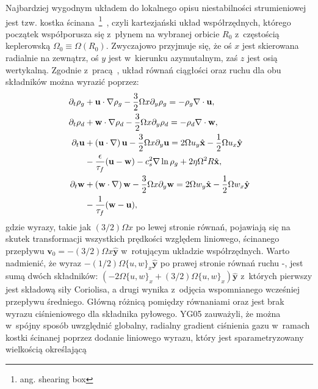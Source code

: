 Najbardziej wygodnym układem do lokalnego opisu niestabilności strumieniowej
jest tzw. kostka ścinana~\footnote{ang. shearing box}~\citep{HGB95}, czyli
kartezjański układ współrzędnych, którego początek współporusza się z~płynem na
wybranej orbicie $R_0$ z~częstością keplerowską $\Omega_0 \equiv
\Omega\left(R_0\right)$. Zwyczajowo przyjmuje się, że oś $x$ jest skierowana
radialnie na zewnątrz, oś $y$ jest w~kierunku azymutalnym, zaś $z$ jest osią
wertykalną. Zgodnie z~pracą~\cite*{YJ07}, układ równań ciągłości oraz ruchu dla
obu składników można wyrazić poprzez:
%
\begin{align}
\partial_t \rho_g &+ \mathbf{u}\cdot\nabla\rho_g - \frac{3}{2}\Omega x\partial_y\rho_g 
 = -\rho_g\nabla\cdot\mathbf{u},\label{eqc1}\\
\partial_t \rho_d &+ \mathbf{w}\cdot\nabla\rho_d - \frac{3}{2}\Omega x\partial_y\rho_d 
 = -\rho_d\nabla\cdot\mathbf{w},\label{eqc2}\\
\partial_t \mathbf{u} &+ \left(\mathbf{u}\cdot\nabla\right)\mathbf{u} 
 - \frac{3}{2}\Omega x\partial_y\mathbf{u} 
 = 2\Omega u_y \hat{\mathbf{x}} -\frac{1}{2}\Omega u_x \hat{\mathbf{y}} \notag\\
 &- \frac{\epsilon}{\tau_f}(\mathbf{u}-\mathbf{w}) -c_s^2\nabla\ln\rho_g 
 +2\eta\Omega^2 R \hat{\mathbf{x}},\label{eqm1}\\
\partial_t \mathbf{w} &+ \left(\mathbf{w}\cdot\nabla\right)\mathbf{w} 
 - \frac{3}{2}\Omega x\partial_y\mathbf{w}
 = 2\Omega w_y \hat{\mathbf{x}} -\frac{1}{2}\Omega w_x \hat{\mathbf{y}} \notag\\
 &- \frac{1}{\tau_f}(\mathbf{w}-\mathbf{u}), \label{eqm2}
\end{align}
%
gdzie wyrazy, takie jak $(3/2)\Omega x$ po lewej stronie równań, pojawiają się na
skutek transformacji wszystkich prędkości względem liniowego, ścinanego przepływu
$\mathbf{v}_0 = -(3/2)\Omega x \hat{\mathbf{y}}$ w~rotującym układzie
współrzędnych. Warto nadmienić, że wyraz $-(1/2)\Omega \{u,w\}_x
\hat{\mathbf{y}}$ po prawej stronie równań ruchu -, jest
sumą dwóch składników: $(-2\Omega \{u,w\}_x + (3/2)\Omega \{u,w\}_x)
\hat{\mathbf{y}}$ z~których pierwszy jest składową siły Coriolisa, a drugi
wynika z~odjęcia wspomnianego wcześniej przepływu średniego. Główną różnicą
pomiędzy równaniami  oraz  jest brak wyrazu ciśnieniowego
dla składnika pyłowego. YG05 zauważyli, że można w~spójny sposób uwzględnić
globalny, radialny gradient ciśnienia gazu w~ramach kostki ścinanej poprzez
dodanie liniowego wyrazu, który jest sparametryzowany wielkością określającą
